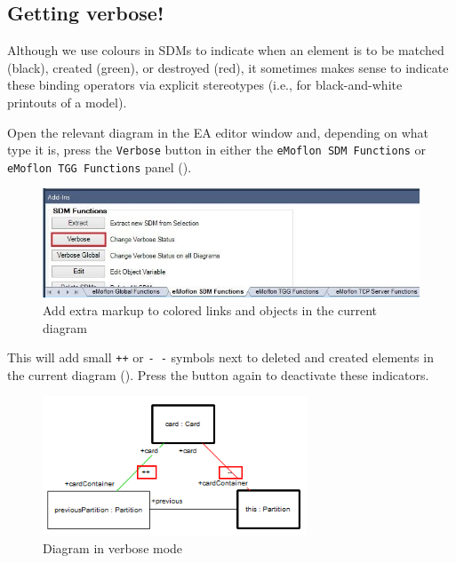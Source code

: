 \subsection{Getting verbose!}

Although we use colours in SDMs to indicate when an element is to be matched (black), created (green), or destroyed (red), it sometimes makes sense to
indicate these binding operators via explicit stereotypes (i.e., for black-and-white printouts of a model).

\begin{stepbystep}
  
\item Open the relevant diagram in the EA editor window and, depending on what type it is, press the \texttt{Verbose} button in
either the \texttt{eMoflon SDM Functions} or \texttt{eMoflon TGG Functions} panel ().

\vspace{0.5cm}

\begin{figure}[htbp]
\begin{center}
  \includegraphics[width=\textwidth]{../../org.moflon.doc.handbook.05_miscellaneous/1_grokkingEA/05_verbose/ea_changeVerboseStatus}
  \caption{Add extra markup to colored links and objects in the current diagram}  
  \label{ea:changeVStatus}
\end{center}
\end{figure}

\item This will add small \texttt{++} or \texttt{-~-} symbols next to deleted and created elements in the current diagram
(). Press the button again to deactivate these indicators.

\begin{figure}[htbp]
\begin{center}
  \includegraphics[width=0.7\textwidth]{../../org.moflon.doc.handbook.05_miscellaneous/1_grokkingEA/05_verbose/ea_verboseSymbols}
  \caption{Diagram in verbose mode}  
  \label{ea:verboseSymbols}
\end{center}
\end{figure}

\end{stepbystep}
